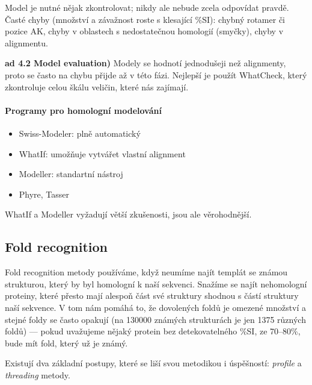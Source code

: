 \documentclass[DIV=8]{scrreprt}
\begin{document}
Model je nutné nějak zkontrolovat; nikdy ale nebude zcela odpovídat pravdě. Časté chyby (množství a závažnost roste s klesající \%SI):  chybný rotamer či pozice AK, chyby v oblastech s nedostatečnou homologií (smyčky), chyby v alignmentu.

\textbf{ad 4.2 Model evaluation)} Modely se hodnotí jednodušeji než alignmenty, proto se často na chybu přijde až v této fázi. Nejlepší je použít WhatCheck, který zkontroluje celou škálu veličin, které nás zajímají.

\paragraph{Programy pro homologní modelování}
\begin{itemize}[nosep]
    \item Swiss-Modeler: plně automatický
    \item WhatIf: umožňuje vytvářet vlastní alignment
    \item Modeller: standartní nástroj
    \item Phyre, Tasser
\end{itemize}



WhatIf a Modeller vyžadují větší zkušenosti, jsou ale věrohodnější.

\subsection{Fold recognition} \label{Fold recognition}


Fold recognition metody používáme, když neumíme najít templát se známou strukturou, který by byl homologní k naší sekvenci. Snažíme se najít nehomologní proteiny, které přesto mají alespoň část své struktury shodnou s částí struktury naší sekvence. V tom nám pomáhá to, že dovolených foldů je omezené množství a stejné foldy se často opakují (na 130000 známých strukturách je jen 1375 různých foldů) --- pokud uvažujeme nějaký protein bez detekovatelného \%SI, ze 70--80\%, bude mít fold, který už je známý.

Existují dva základní postupy, které se liší svou metodikou i úspěšností: \emph{profile} a \emph{threading} metody.
\end{document}
